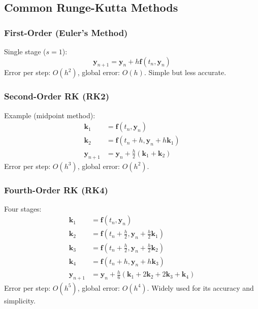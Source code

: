 \documentclass[a4paper,12pt]{article}
\begin{document}
\subsection*{Common Runge-Kutta Methods}

\subsubsection*{First-Order (Euler’s Method)}
Single stage (\(s=1\)):
\begin{equation}
\mathbf{y}_{n+1} = \mathbf{y}_n + h \mathbf{f}(t_n, \mathbf{y}_n)
\end{equation}
Error per step: \(O(h^2)\), global error: \(O(h)\). Simple but less accurate.

\subsubsection*{Second-Order RK (RK2)}
Example (midpoint method):
\begin{align}
\mathbf{k}_1 &= \mathbf{f}(t_n, \mathbf{y}_n) \\
\mathbf{k}_2 &= \mathbf{f}(t_n + h, \mathbf{y}_n + h \mathbf{k}_1) \\
\mathbf{y}_{n+1} &= \mathbf{y}_n + \frac{h}{2} (\mathbf{k}_1 + \mathbf{k}_2)
\end{align}
Error per step: \(O(h^3)\), global error: \(O(h^2)\).

\subsubsection*{Fourth-Order RK (RK4)}
Four stages:
\begin{align}
\mathbf{k}_1 &= \mathbf{f}(t_n, \mathbf{y}_n) \\
\mathbf{k}_2 &= \mathbf{f}\left(t_n + \frac{h}{2}, \mathbf{y}_n + \frac{h}{2} \mathbf{k}_1\right) \\
\mathbf{k}_3 &= \mathbf{f}\left(t_n + \frac{h}{2}, \mathbf{y}_n + \frac{h}{2} \mathbf{k}_2\right) \\
\mathbf{k}_4 &= \mathbf{f}(t_n + h, \mathbf{y}_n + h \mathbf{k}_3) \\
\mathbf{y}_{n+1} &= \mathbf{y}_n + \frac{h}{6} ( \mathbf{k}_1 + 2 \mathbf{k}_2 + 2 \mathbf{k}_3 + \mathbf{k}_4 )
\end{align}
Error per step: \(O(h^5)\), global error: \(O(h^4)\). Widely used for its accuracy and simplicity.

\end{document}
